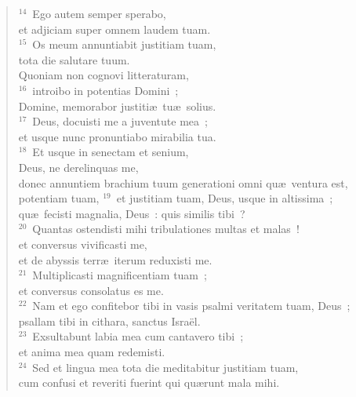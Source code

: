 \begin{flushleft}
\begin{verse}
${}^{14}$~Ego autem semper sperabo,\\ et adjiciam super omnem laudem tuam.\\
${}^{15}$~Os meum annuntiabit justitiam tuam,\\ tota die salutare tuum.\\ Quoniam non cognovi litteraturam,\\
${}^{16}$~introibo in potentias Domini~;\\ Domine, memorabor justiti\ae\ tu\ae\ solius.\\
${}^{17}$~Deus, docuisti me a juventute mea~;\\ et usque nunc pronuntiabo mirabilia tua.\\
${}^{18}$~Et usque in senectam et senium,\\ Deus, ne derelinquas me,\\ donec annuntiem brachium tuum generationi omni qu\ae\ ventura est,\\ potentiam tuam,
${}^{19}$~et justitiam tuam, Deus, usque in altissima~;\\ qu\ae\ fecisti magnalia, Deus~: quis similis tibi~?\\
${}^{20}$~Quantas ostendisti mihi tribulationes multas et malas~!\\ et conversus vivificasti me,\\ et de abyssis terr\ae\ iterum reduxisti me.\\
${}^{21}$~Multiplicasti magnificentiam tuam~;\\ et conversus consolatus es me.\\
${}^{22}$~Nam et ego confitebor tibi in vasis psalmi veritatem tuam, Deus~;\\ psallam tibi in cithara, sanctus Isra\"el.\\
${}^{23}$~Exsultabunt labia mea cum cantavero tibi~;\\ et anima mea quam redemisti.\\
${}^{24}$~Sed et lingua mea tota die meditabitur justitiam tuam,\\ cum confusi et reveriti fuerint qui qu\ae runt mala mihi.\end{verse}\end{flushleft}


